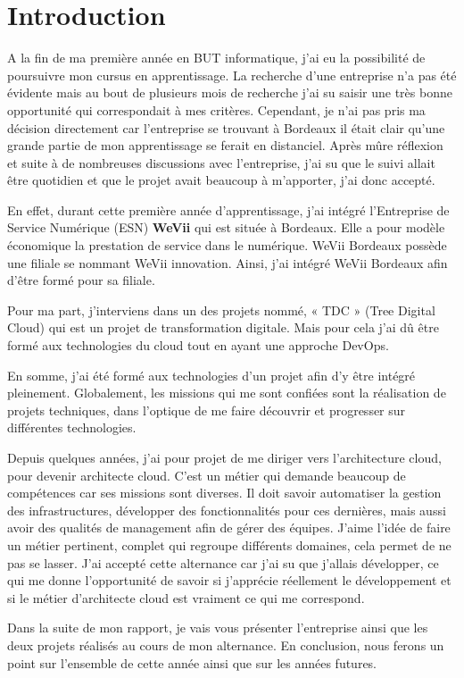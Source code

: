 \chapter*{Introduction}

A la fin de ma première année en BUT informatique, j’ai eu la possibilité de poursuivre mon cursus en apprentissage.
La recherche d’une entreprise n’a pas été évidente mais au bout de plusieurs mois de recherche j’ai su saisir une très bonne opportunité qui correspondait à mes critères.
Cependant, je n’ai pas pris ma décision directement car l’entreprise se trouvant à Bordeaux il était clair qu’une grande partie de mon apprentissage se ferait en distanciel.
Après mûre réflexion et suite à de nombreuses discussions avec l’entreprise, j’ai su que le suivi allait être quotidien et que le projet avait beaucoup à m’apporter, j’ai donc accepté.

\bigskip

En effet, durant cette première année d’apprentissage, j’ai intégré l’Entreprise de Service Numérique (ESN) \textbf{WeVii} qui est située à Bordeaux.
Elle a pour modèle économique la prestation de service dans le numérique.
WeVii Bordeaux possède une filiale se nommant WeVii innovation.
Ainsi, j’ai intégré WeVii Bordeaux afin d’être formé pour sa filiale.

\bigskip

Pour ma part, j’interviens dans un des projets nommé, « TDC » (Tree Digital Cloud) qui est un projet de transformation digitale.
Mais pour cela j’ai dû être formé aux technologies du cloud tout en ayant une approche DevOps.

\bigskip

En somme, j'ai été formé aux technologies d’un projet afin d’y être intégré pleinement.
Globalement, les missions qui me sont confiées sont la réalisation de projets techniques, dans l’optique de me faire découvrir et progresser sur différentes technologies.

\bigskip

Depuis quelques années, j’ai pour projet de me diriger vers l’architecture cloud, pour devenir architecte cloud.
C’est un métier qui demande beaucoup de compétences car ses missions sont diverses.
Il doit savoir automatiser la gestion des infrastructures, développer des fonctionnalités pour ces dernières, mais aussi avoir des qualités de management afin de gérer des équipes.
J’aime l’idée de faire un métier pertinent, complet qui regroupe différents domaines, cela permet de ne pas se lasser.
J’ai accepté cette alternance car j’ai su que j’allais développer, ce qui me donne l’opportunité de savoir si j’apprécie réellement le développement et si le métier d’architecte cloud est vraiment ce qui me correspond.

\bigskip

Dans la suite de mon rapport, je vais vous présenter l’entreprise ainsi que les deux projets réalisés au cours de mon alternance.
En conclusion, nous ferons un point sur l’ensemble de cette année ainsi que sur les années futures.

\clearpage
